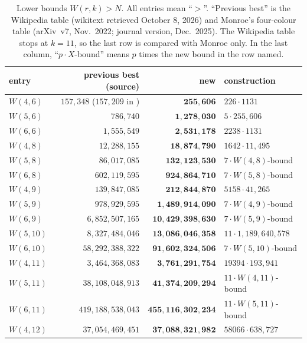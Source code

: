 \documentclass[11pt]{article}
\numberwithin{equation}{section}
\theoremstyle{definition}
\theoremstyle{remark}
\newcommand{\W}{W}
\begin{document}
\begin{table}[ht]
\centering\small
\begin{tabular}{@{}lrrl@{}}
\toprule
entry & previous best (source) & \textbf{new} & construction \\
\midrule
$\W(4,6)$  & $157{,}348$ \cite{Mon25} ($157{,}209$ in \cite{wiki}) & $\mathbf{255{,}606}$ & $226\cdot 1131$ \\
$\W(5,6)$  & $786{,}740$ \cite{wiki} & $\mathbf{1{,}278{,}030}$ & $5\cdot 255{,}606$ \\
$\W(6,6)$  & $1{,}555{,}549$ \cite{wiki} & $\mathbf{2{,}531{,}178}$ & $2238\cdot1131$ \\
$\W(4,8)$  & $12{,}288{,}155$ \cite{Mon25,wiki} & $\mathbf{18{,}874{,}790}$ & $1642\cdot 11{,}495$ \\
$\W(5,8)$  & $86{,}017{,}085$ \cite{wiki} & $\mathbf{132{,}123{,}530}$ & $7\cdot \W(4,8)$-bound \\
$\W(6,8)$  & $602{,}119{,}595$ \cite{wiki} & $\mathbf{924{,}864{,}710}$ & $7\cdot \W(5,8)$-bound \\
$\W(4,9)$  & $139{,}847{,}085$ \cite{Mon25,wiki} & $\mathbf{212{,}844{,}870}$ & $5158\cdot 41{,}265$ \\
$\W(5,9)$  & $978{,}929{,}595$ \cite{wiki} & $\mathbf{1{,}489{,}914{,}090}$ & $7\cdot \W(4,9)$-bound \\
$\W(6,9)$  & $6{,}852{,}507{,}165$ \cite{wiki} & $\mathbf{10{,}429{,}398{,}630}$ & $7\cdot \W(5,9)$-bound \\
$\W(5,10)$ & $8{,}327{,}484{,}046$ \cite{wiki} & $\mathbf{13{,}086{,}046{,}358}$ & $11\cdot 1{,}189{,}640{,}578$ \\
$\W(6,10)$ & $58{,}292{,}388{,}322$ \cite{wiki} & $\mathbf{91{,}602{,}324{,}506}$ & $7\cdot \W(5,10)$-bound \\
$\W(4,11)$ & $3{,}464{,}368{,}083$ \cite{Mon25,wiki} & $\mathbf{3{,}761{,}291{,}754}$ & $19394\cdot 193{,}941$ \\
$\W(5,11)$ & $38{,}108{,}048{,}913$ \cite{wiki} & $\mathbf{41{,}374{,}209{,}294}$ & $11\cdot \W(4,11)$-bound \\
$\W(6,11)$ & $419{,}188{,}538{,}043$ \cite{wiki} & $\mathbf{455{,}116{,}302{,}234}$ & $11\cdot \W(5,11)$-bound \\
$\W(4,12)$ & $37{,}054{,}469{,}451$ \cite{Mon25} & $\mathbf{37{,}088{,}321{,}982}$ & $58066\cdot 638{,}727$ \\
\bottomrule
\end{tabular}
\caption{Lower bounds $\W(r,k)>N$.  All entries mean ``$>$''.  ``Previous best'' is the
Wikipedia table (wikitext retrieved October 8, 2026) and Monroe's four-colour table
(arXiv~v7, Nov.~2022; journal version, Dec.~2025).  The Wikipedia table stops at $k=11$, so the
last row is compared with Monroe only.  In the last column, ``$p\cdot X$-bound'' means $p$ times
the new bound in the row named.}
\label{tab:main}
\end{table}
\end{document}
